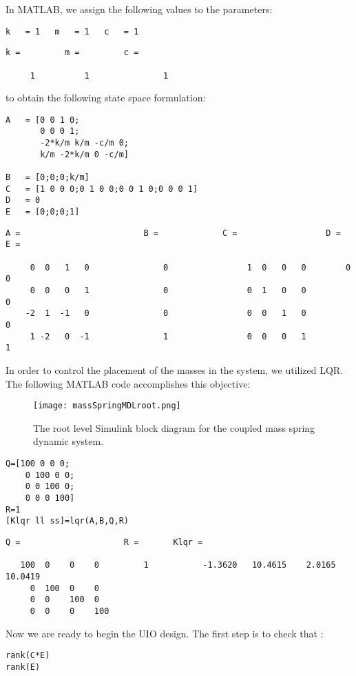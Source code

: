 \documentclass{amsart}
\theoremstyle{definition}
\theoremstyle{remark}
\numberwithin{equation}{section}
\begin{document}
In MATLAB, we assign the following values to the parameters:
\begin{verbatim}
k   = 1   m   = 1   c   = 1 \end{verbatim}

        \color{lightgray} \begin{verbatim}
k =         m =         c = 

     1          1               1

\end{verbatim} \color{black}
to obtain the following state space formulation: \\ 
    \begin{verbatim}
A   = [0 0 1 0;
       0 0 0 1;
       -2*k/m k/m -c/m 0;
       k/m -2*k/m 0 -c/m]

B   = [0;0;0;k/m]
C   = [1 0 0 0;0 1 0 0;0 0 1 0;0 0 0 1]
D   = 0
E   = [0;0;0;1]
\end{verbatim}

        \color{lightgray} \begin{verbatim}
A =                         B =             C =                  D =        E = 

     0  0   1   0               0                1  0   0   0        0              0
     0  0   0   1               0                0  1   0   0                       0
    -2  1  -1   0               0                0  0   1   0                       0
     1 -2   0  -1               1                0  0   0   1                       1

\end{verbatim} \color{black}
In order to control the placement of the masses in the system, we utilized LQR.  The following MATLAB code accomplishes this objective: 

\begin{figure}[H]
    \centering
    \texttt{[image: massSpringMDLroot.png]}
    \caption{The root level Simulink block diagram for the coupled mass spring dynamic system.}
    \label{ex:msMDLroot}
\end{figure}

    \begin{verbatim}
Q=[100 0 0 0;
    0 100 0 0;
    0 0 100 0;
    0 0 0 100]
R=1
[Klqr ll ss]=lqr(A,B,Q,R)
\end{verbatim}

        \color{lightgray} \begin{verbatim}
Q =                     R =       Klqr = 

   100  0    0    0         1           -1.3620   10.4615    2.0165   10.0419
     0  100  0    0
     0  0    100  0
     0  0    0    100

\end{verbatim} \color{black}
Now we are ready to begin the UIO design.  The first step is to check that :  
    \begin{verbatim}
rank(C*E)
rank(E)
\end{verbatim}
\end{document}
